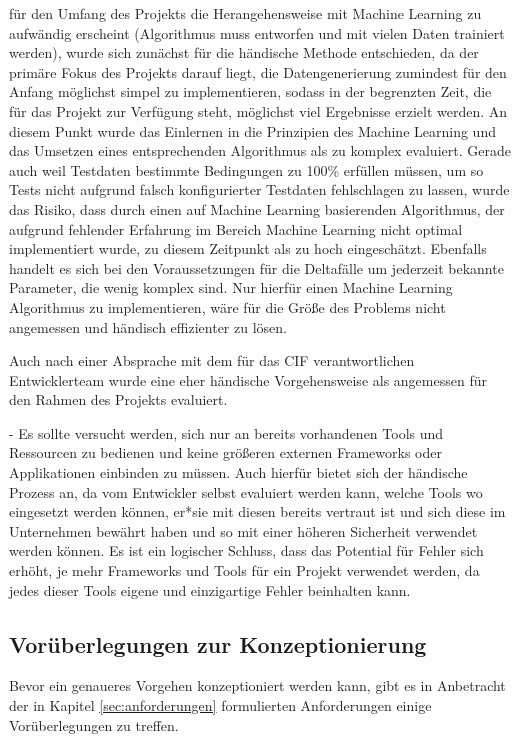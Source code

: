 für den Umfang des Projekts die Herangehensweise mit Machine Learning zu aufwändig erscheint (Algorithmus muss entworfen und mit vielen Daten trainiert werden), wurde sich zunächst für die händische Methode entschieden, da der primäre Fokus des Projekts darauf liegt, die Datengenerierung zumindest für den Anfang möglichst simpel zu implementieren, sodass in der begrenzten Zeit, die für das Projekt zur Verfügung steht, möglichst viel Ergebnisse erzielt werden. An diesem Punkt wurde das Einlernen in die Prinzipien des Machine Learning und das Umsetzen eines entsprechenden Algorithmus als zu komplex evaluiert. Gerade auch weil Testdaten bestimmte Bedingungen zu 100\% erfüllen müssen, um so Tests nicht aufgrund falsch konfigurierter Testdaten fehlschlagen zu lassen, wurde das Risiko, dass durch einen auf Machine Learning basierenden Algorithmus, der aufgrund fehlender Erfahrung im Bereich Machine Learning nicht optimal implementiert wurde, zu diesem Zeitpunkt als zu hoch eingeschätzt. Ebenfalls handelt es sich bei den Voraussetzungen für die Deltafälle um jederzeit bekannte Parameter, die wenig komplex sind. Nur hierfür einen Machine Learning Algorithmus zu implementieren, wäre für die Größe des Problems nicht angemessen und händisch effizienter zu lösen.

Auch nach einer Absprache mit dem für das \ac*{CIF} verantwortlichen Entwicklerteam wurde eine eher händische Vorgehensweise als angemessen für den Rahmen des Projekts evaluiert.

- Es sollte versucht werden, sich nur an bereits vorhandenen Tools und Ressourcen zu bedienen und keine größeren externen Frameworks oder Applikationen einbinden zu müssen. Auch hierfür bietet sich der händische Prozess an, da vom Entwickler selbst evaluiert werden kann, welche Tools wo eingesetzt werden können, er*sie mit diesen bereits vertraut ist und sich diese im Unternehmen bewährt haben und so mit einer höheren Sicherheit verwendet werden können. Es ist ein logischer Schluss, dass das Potential für Fehler sich erhöht, je mehr Frameworks und Tools für ein Projekt verwendet werden, da jedes dieser Tools eigene und einzigartige Fehler beinhalten kann.

\subsection{Vorüberlegungen zur Konzeptionierung}\label{subsec:vorueberlegungen}
Bevor ein genaueres Vorgehen konzeptioniert werden kann, gibt es in Anbetracht der in Kapitel \ref{sec:anforderungen} formulierten Anforderungen einige Vorüberlegungen zu treffen.

